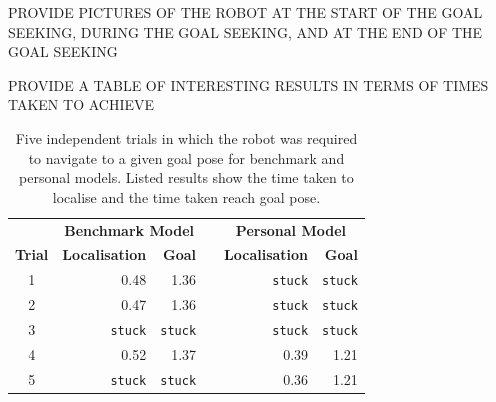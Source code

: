 \documentclass[a4paper]{article}
\begin{document}
\vspace{0.5cm}

PROVIDE PICTURES OF THE ROBOT AT THE START OF THE GOAL SEEKING, DURING THE GOAL SEEKING, AND AT THE END OF THE GOAL SEEKING

PROVIDE A TABLE OF INTERESTING RESULTS IN TERMS OF TIMES TAKEN TO ACHIEVE

\begin{table}[h]
\centering
\caption{Five independent trials in which the robot was required to navigate to a given goal pose for benchmark and personal models. Listed results show the time taken to localise and the time taken reach goal pose.}
\begin{tabular}{crrcrr}
\toprule
& \multicolumn{2}{c}{\textbf{Benchmark Model}} & & \multicolumn{2}{c}{\textbf{Personal Model}} \\
\cline{2-3} \cline{5-6}
\textbf{Trial} & \textbf{Localisation} & \textbf{Goal} & & \textbf{Localisation} & \textbf{Goal} \\
\midrule
1 & 0.48 & 1.36 & & \texttt{stuck} & \texttt{stuck} \\
2 & 0.47 & 1.36 & & \texttt{stuck} & \texttt{stuck} \\
3 & \texttt{stuck} & \texttt{stuck} & & \texttt{stuck} & \texttt{stuck} \\
4 & 0.52 & 1.37 & & 0.39 & 1.21 \\
5 & \texttt{stuck} & \texttt{stuck} & & 0.36 & 1.21 \\
\bottomrule
\end{tabular}
\end{table}

\newpage
\end{document}
